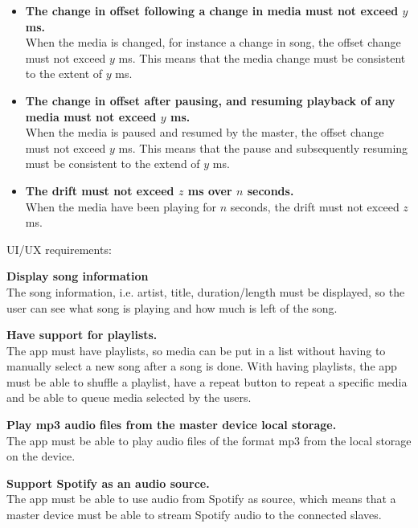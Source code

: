 \begin{eletterate}
\begin{itemize}
        \item \textbf{The change in offset following a change in media must not exceed $y$ ms.} \hfill\\
            When the media is changed, for instance a change in song, the offset change must not exceed $y$ ms.
            This means that the media change must be consistent to the extent of $y$ ms.

        \item \textbf{The change in offset after pausing, and resuming playback of any media must not exceed $y$ ms.} \hfill\\
            When the media is paused and resumed by the master, the offset change must not exceed $y$ ms.
            This means that the pause and subsequently resuming must be consistent to the extend of $y$ ms.

        \item \textbf{The drift must not exceed $z$ ms over $n$ seconds.} \hfill\\
            When the media have been playing for $n$ seconds, the drift must not exceed $z$ ms.
    \end{itemize}
\end{eletterate}
UI/UX requirements:
\begin{eletterate}[resume]
    \item \textbf{Display song information} \hfill\\
        The song information, i.e. artist, title, duration/length must be displayed,
        so the user can see what song is playing and how much is left of the song.

    \item \textbf{Have support for playlists.} \hfill\\
        The app must have playlists, so media can be put in a list without having to manually select a new song after a song is done.
        With having playlists, the app must be able to shuffle a playlist, 
        have a repeat button to repeat a specific media and be able to queue media selected by the users.

    \item \textbf{Play mp3 audio files from the master device local storage.} \hfill\\
        The app must be able to play audio files of the format mp3 from the local storage on the device.

    \item \textbf{Support Spotify as an audio source.} \hfill\\
        The app must be able to use audio from Spotify as source,
        which means that a master device must be able to stream Spotify audio to the connected slaves.
\end{eletterate}
